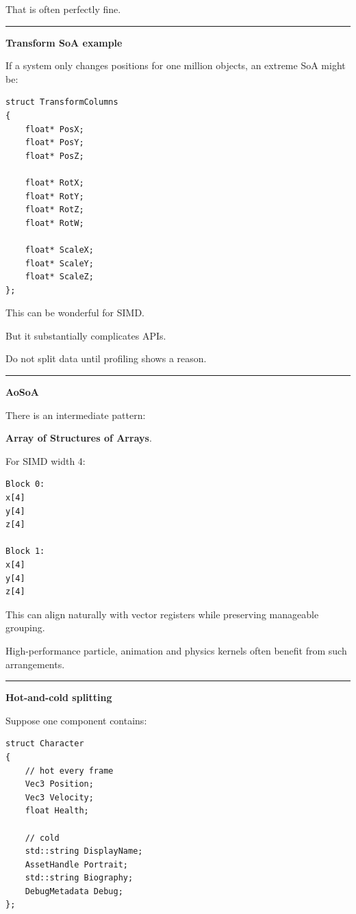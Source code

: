 That is often perfectly fine.

\begin{center}\rule{0.5\linewidth}{0.5pt}\end{center}

\textbf{Transform SoA example}

If a system only changes positions for one million objects, an extreme SoA might be:

\begin{verbatim}
struct TransformColumns
{
    float* PosX;
    float* PosY;
    float* PosZ;

    float* RotX;
    float* RotY;
    float* RotZ;
    float* RotW;

    float* ScaleX;
    float* ScaleY;
    float* ScaleZ;
};
\end{verbatim}

This can be wonderful for SIMD.

But it substantially complicates APIs.

Do not split data until profiling shows a reason.

\begin{center}\rule{0.5\linewidth}{0.5pt}\end{center}

\textbf{AoSoA}

There is an intermediate pattern:

\textbf{Array of Structures of Arrays}.

For SIMD width 4:

\begin{verbatim}
Block 0:
x[4]
y[4]
z[4]

Block 1:
x[4]
y[4]
z[4]
\end{verbatim}

This can align naturally with vector registers while preserving manageable grouping.

High-performance particle, animation and physics kernels often benefit from such arrangements.

\begin{center}\rule{0.5\linewidth}{0.5pt}\end{center}

\textbf{Hot-and-cold splitting}

Suppose one component contains:

\begin{verbatim}
struct Character
{
    // hot every frame
    Vec3 Position;
    Vec3 Velocity;
    float Health;

    // cold
    std::string DisplayName;
    AssetHandle Portrait;
    std::string Biography;
    DebugMetadata Debug;
};
\end{verbatim}

